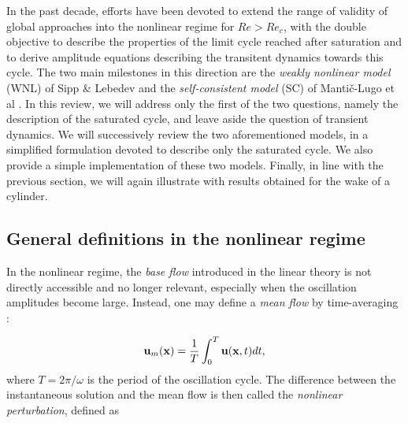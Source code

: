 \documentclass[twocolumn,10pt]{asme2ej}
\newcommand{\be}[1]{ \begin{equation} \label{#1}}
\newcommand{\ee}{\end{equation}}
\begin{document}

In the past decade, efforts have been devoted to extend the range of validity of global approaches into the nonlinear regime for $Re>Re_c$, with the double objective to describe the properties of the limit cycle reached after saturation and to derive amplitude equations describing the transitent dynamics towards this cycle. The two main milestones in this direction  are the {\em weakly nonlinear model}  (WNL) of Sipp \& Lebedev \cite{SippLebedev} and the {\em self-consistent model} (SC) of Manti\v{c}-Lugo et al \cite{MLugo2014}.
 In this review, we will address only the first of the two questions, namely  the description of the saturated cycle, and leave aside the question of transient dynamics. We will successively review the two aforementioned models, in a simplified formulation devoted to describe only the saturated cycle. We also provide a simple implementation of these two models. Finally, in line with the previous section, we will again illustrate with results obtained for the wake of a cylinder.
 
 
 

\subsection{General definitions in the nonlinear regime}


In the nonlinear regime, the {\em base flow} introduced in the linear theory is not directly accessible and no longer relevant, especially when the oscillation amplitudes become large. 
Instead, one may define a {\em mean flow} by time-averaging : 

\be{defumean}
{\bf u}_m({\bf x})  = \frac{1}{T} \int_0^{T}  {\bf u}({\bf x},t)  dt,
\ee
where $T = 2\pi/\omega$  is the period of the oscillation cycle. The difference between the instantaneous solution and the mean flow is then called the {\em nonlinear perturbation}, defined as 
\end{document}
